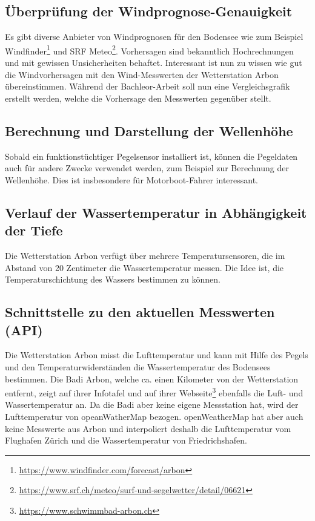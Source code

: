 \subsection{Überprüfung der Windprognose-Genauigkeit }
Es gibt diverse Anbieter von Windprognosen für den Bodensee wie zum Beispiel Windfinder\footnote{ \url{https://www.windfinder.com/forecast/arbon}} und SRF Meteo\footnote{ \url{https://www.srf.ch/meteo/surf-und-segelwetter/detail/06621}}. Vorhersagen sind bekanntlich Hochrechnungen und mit gewissen Unsicherheiten behaftet. Interessant ist nun zu wissen wie gut die Windvorhersagen mit den Wind-Messwerten der Wetterstation Arbon übereinstimmen. Während der Bachleor-Arbeit soll nun eine Vergleichsgrafik erstellt werden, welche die Vorhersage den Messwerten gegenüber stellt.


\subsection{Berechnung und Darstellung der Wellenhöhe}
Sobald ein funktionstüchtiger Pegelsensor installiert ist, können die Pegeldaten auch für andere Zwecke verwendet werden, zum Beispiel zur Berechnung der Wellenhöhe. Dies ist insbesondere für Motorboot-Fahrer interessant.


\subsection{Verlauf der Wassertemperatur in Abhängigkeit der Tiefe}
Die Wetterstation Arbon verfügt über mehrere Temperatursensoren, die im Abstand von 20 Zentimeter die Wassertemperatur messen. Die Idee ist, die Temperaturschichtung des Wassers bestimmen zu können.


\subsection{Schnittstelle zu den aktuellen Messwerten (API)}
Die Wetterstation Arbon misst die Lufttemperatur und kann mit Hilfe des Pegels und den Temperaturwiderständen die Wassertemperatur des Bodensees bestimmen. Die Badi Arbon, welche ca. einen Kilometer von der Wetterstation entfernt, zeigt auf ihrer Infotafel und auf ihrer Webseite\footnote{ \url{https://www.schwimmbad-arbon.ch}} ebenfalls die Luft- und Wassertemperatur an. Da die Badi aber keine eigene Messstation hat, wird der Lufttemperatur von opeanWatherMap bezogen. openWeatherMap hat aber auch keine Messwerte aus Arbon und interpoliert deshalb die Lufttemperatur vom Flughafen Zürich und die Wassertemperatur von Friedrichshafen.

